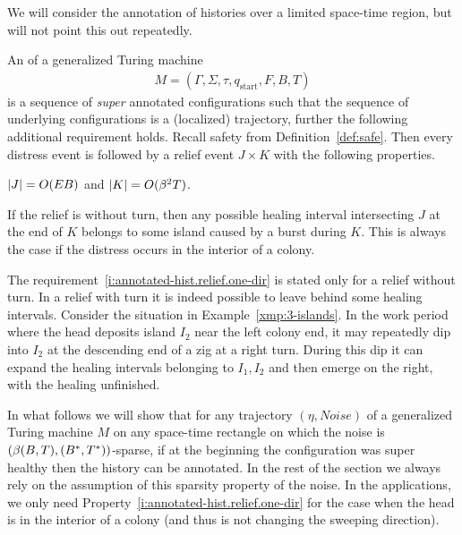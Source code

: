 \documentclass[12pt]{memoir}
\def\B{B}
\newcommand{\E}{E}
\newcommand{\Noise}{\mathit{Noise}}
\newcommand{\Tu}{T}
\newcommand{\start}{\mathrm{start}}
\begin{document}
We will consider the annotation of histories over a limited space-time region, but will
not point this out repeatedly.

\begin{definition}\label{def:annotated-hist}
An  of a generalized Turing machine
    \begin{align*}
        M=(\Gamma,\Sigma,\tau,q_{\start},F,B,\Tu{})
     \end{align*}
is a sequence of \emph{super} annotated configurations such that
the sequence of underlying configurations is a (localized) trajectory, further 
the following additional requirement holds.
Recall safety from Definition~\ref{def:safe}.
Then every distress event is followed by a relief event \( J\times K \) with 
the following properties.
\begin{alphenumIn}

\item \label{i:annotated-hist.relief.size}
\( \abs{J}=O(\E\B) \) and \( \abs{K}= O(\beta^{2}\Tu) \). %

\item\label{i:annotated-hist.relief.one-dir} 
If the relief is without turn, then
any possible healing interval intersecting \( J \) at the end of \( K \) belongs
to some island caused by a burst during \( K \).
This is always the case if the distress occurs in the interior of a colony.
\end{alphenumIn}

\end{definition}

The requirement~\ref{i:annotated-hist.relief.one-dir} is stated only for a relief
without turn.
In a relief with turn it is indeed possible to leave behind some healing intervals.
Consider the situation in Example~\ref{xmp:3-islands}.
In the work period where the head deposits island \( I_{2} \) near the left colony
end, it may repeatedly dip into \( I_{2} \) at the descending end of a zig at a
right turn.
During this dip it can expand the healing intervals belonging 
to \( I_{1}, I_{2} \) and then emerge on the right, with the healing unfinished.

In what follows we will show that for any trajectory \( (\eta, \Noise) \) of a
generalized Turing machine \( M \) on any space-time rectangle on which the
noise is \( (\beta\pair{\B}{\Tu}, \pair{\B^{*}}{\Tu^{*}}) \)-sparse, if at the
beginning the configuration was super healthy then the history can be annotated.
In the rest of the section we always rely on the assumption of  this 
sparsity property of the noise.
In the applications, we only need Property~\ref{i:annotated-hist.relief.one-dir}
for the case when the head is in the interior of a colony (and thus is not changing the
sweeping direction).
\end{document}
